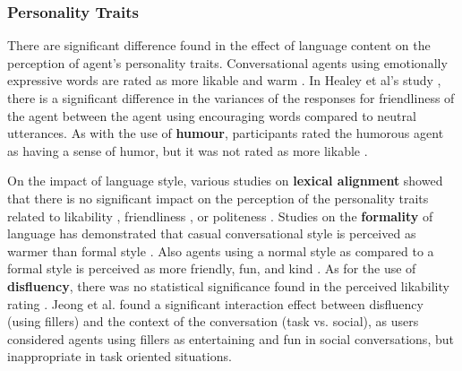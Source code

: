 \documentclass[sigconf,screen,review, anonymous]{acmart}
\newcommand{\cmt}[1]{}%
\begin{document}



\subsubsection{Personality Traits \nopunct}

There are significant difference found in the effect of language content on the perception of agent's personality traits. Conversational agents using emotionally expressive words are rated as more likable \cite{zhu2022effects}\cmt{[26]} and warm \cite{lee2019s}\cmt{[55]}. In Healey et al's study \cite{healey2013relating}\cmt{[39]}, there is a significant difference in the variances of the responses for friendliness of the agent between the agent using encouraging words compared to neutral utterances. As with the use of \textbf{humour}, participants rated the humorous agent as having a sense of humor, but it was not rated as more likable \cite{ceha2021can}\cmt{[57]}.




%

On the impact of language style, various studies on \textbf{lexical alignment} showed that there is no significant impact on the perception of the personality traits related to likability \cite{huiyang2022improving}\cmt{[17]}\cite{linnemann2018can}\cmt{[15]}, friendliness \cite{spillner2021talk}\cmt{[18]}, or politeness \cite{spillner2021talk}\cmt{[18]}. Studies on the \textbf{formality} of language has demonstrated that casual conversational style is perceived as warmer than formal style \cite{cox2022does}\cmt{[27]}. Also agents using a normal style as compared to a formal style is perceived as more friendly, fun, and kind \cite{ouchi2019should}\cmt{[59]}. As for the use of \textbf{disfluency}, there was no statistical significance found in the perceived likability rating \cite{jeong2019exploring}\cmt{[10]}\cite{pfeifer2009should}\cmt{[12]}. Jeong et al. \cite{jeong2019exploring} found a significant interaction effect between disfluency (using fillers) and the context of the conversation (task vs. social), as users considered agents using fillers as entertaining and fun in social conversations, but inappropriate in task oriented situations.
\end{document}
